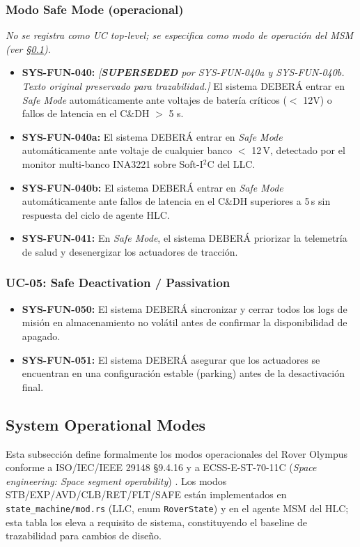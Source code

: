 \subsubsection{Modo Safe Mode (operacional)}
\emph{No se registra como UC top-level; se especifica como modo de operación del MSM (ver \S\ref{subsec:op_modes}).}
\begin{itemize}
    \item \textbf{SYS-FUN-040:} \textit{[\textbf{SUPERSEDED} por SYS-FUN-040a y SYS-FUN-040b. Texto original preservado para trazabilidad.]} El sistema DEBERÁ entrar en \emph{Safe Mode} automáticamente ante voltajes de batería críticos ($<$ 12V) o fallos de latencia en el C\&DH $>$ 5 s.
    \item \textbf{SYS-FUN-040a:} El sistema DEBERÁ entrar en \emph{Safe Mode} automáticamente ante voltaje de cualquier banco $<$ 12\,V, detectado por el monitor multi-banco INA3221 sobre Soft-I$^2$C del LLC.
    \item \textbf{SYS-FUN-040b:} El sistema DEBERÁ entrar en \emph{Safe Mode} automáticamente ante fallos de latencia en el C\&DH superiores a 5\,s sin respuesta del ciclo de agente HLC.
    \item \textbf{SYS-FUN-041:} En \emph{Safe Mode}, el sistema DEBERÁ priorizar la telemetría de salud y desenergizar los actuadores de tracción.
\end{itemize}

\subsubsection{UC-05: Safe Deactivation / Passivation}
\begin{itemize}
    \item \textbf{SYS-FUN-050:} El sistema DEBERÁ sincronizar y cerrar todos los logs de misión en almacenamiento no volátil antes de confirmar la disponibilidad de apagado.
    \item \textbf{SYS-FUN-051:} El sistema DEBERÁ asegurar que los actuadores se encuentran en una configuración estable (parking) antes de la desactivación final.
\end{itemize}

\subsection{System Operational Modes}\label{subsec:op_modes}

Esta subsección define formalmente los modos operacionales del Rover Olympus conforme a ISO/IEC/IEEE 29148 §9.4.16 y a ECSS-E-ST-70-11C (\textit{Space engineering: Space segment operability}) \cite{ecss_e_st_70_11c}. Los modos STB/EXP/AVD/CLB/RET/FLT/SAFE están implementados en \texttt{state\_machine/mod.rs} (LLC, enum \texttt{RoverState}) y en el agente MSM del HLC; esta tabla los eleva a requisito de sistema, constituyendo el baseline de trazabilidad para cambios de diseño.

